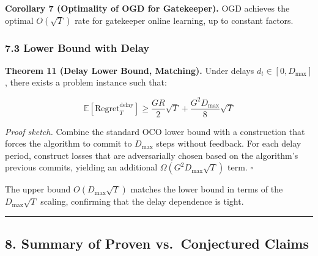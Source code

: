 \documentclass[
  12pt,
]{ctexart}
\begin{document}
\textbf{Corollary 7 (Optimality of OGD for Gatekeeper).} OGD achieves
the optimal \(O(\sqrt{T})\) rate for gatekeeper online learning, up to
constant factors.

\subsubsection{7.3 Lower Bound with Delay}\label{lower-bound-with-delay}

\textbf{Theorem 11 (Delay Lower Bound, Matching).} Under delays
\(d_t \in [0, D_{\max}]\), there exists a problem instance such that:

\[\mathbb{E}[\text{Regret}_T^{\text{delay}}] \geq \frac{GR}{2} \sqrt{T} + \frac{G^2 D_{\max}}{8} \sqrt{T}\]

\emph{Proof sketch.} Combine the standard OCO lower bound with a
construction that forces the algorithm to commit to \(D_{\max}\) steps
without feedback. For each delay period, construct losses that are
adversarially chosen based on the algorithm's previous commits, yielding
an additional \(\Omega(G^2 D_{\max}\sqrt{T})\) term. \(\square\)

The upper bound \(O(D_{\max}\sqrt{T})\) matches the lower bound in terms
of the \(D_{\max}\sqrt{T}\) scaling, confirming that the delay
dependence is tight.

\begin{center}\rule{0.5\linewidth}{0.5pt}\end{center}

\subsection{8. Summary of Proven vs.~Conjectured
Claims}\label{summary-of-proven-vs.-conjectured-claims}
\end{document}

